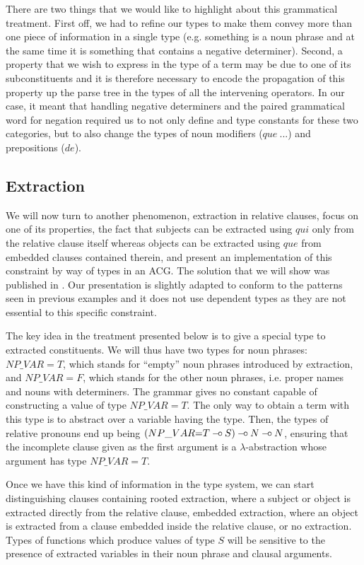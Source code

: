 There are two things that we would like to highlight about this
grammatical treatment. First off, we had to refine our types to make
them convey more than one piece of information in a single type
(e.g. something is a noun phrase and at the same time it is something
that contains a negative determiner). Second, a property that we wish to
express in the type of a term may be due to one of its subconstituents
and it is therefore necessary to encode the propagation of this property
up the parse tree in the types of all the intervening operators. In our
case, it meant that handling negative determiners and the paired
grammatical word for negation required us to not only define and type
constants for these two categories, but to also change the types of noun
modifiers ($que\ ...$) and prepositions ($de$).


\subsection{Extraction}
\label{ssec:extraction}

We will now turn to another phenomenon, extraction in relative clauses,
focus on one of its properties, the fact that subjects can be extracted
using $qui$ only from the relative clause itself whereas objects can be
extracted using $que$ from embedded clauses contained therein, and
present an implementation of this constraint by way of types in an
ACG. The solution that we will show was published in
\cite{pogodalla2012controlling}. Our presentation is slightly adapted to
conform to the patterns seen in previous examples and it does not use
dependent types as they are not essential to this specific constraint.

The key idea in the treatment presented below is to give a special type
to extracted constituents. We will thus have two types for noun phrases:
$NP\_VAR{=}T$, which stands for ``empty'' noun phrases introduced by
extraction, and $NP\_VAR{=}F$, which stands for the other noun phrases,
i.e.  proper names and nouns with determiners. The grammar gives no
constant capable of constructing a value of type $NP\_VAR{=}T$. The only
way to obtain a term with this type is to abstract over a variable
having the type. Then, the types of relative pronouns end up being
$(NP\_VAR{=}T \mathbin{{-}\mkern-3.5mu{\circ}} S) \mathbin{{-}\mkern-3.5mu{\circ}} N \mathbin{{-}\mkern-3.5mu{\circ}} N$, ensuring that the incomplete
clause given as the first argument is a $\lambda$-abstraction whose
argument has type $NP\_VAR{=}T$.

Once we have this kind of information in the type system, we can start
distinguishing clauses containing rooted extraction, where a subject or
object is extracted directly from the relative clause, embedded
extraction, where an object is extracted from a clause embedded inside
the relative clause, or no extraction. Types of functions which produce
values of type $S$ will be sensitive to the presence of extracted
variables in their noun phrase and clausal arguments.

